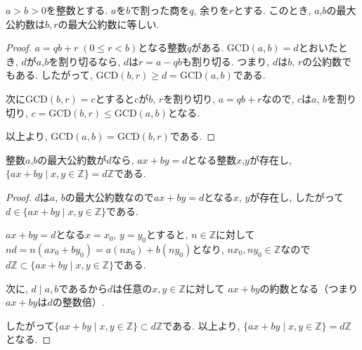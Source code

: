 \begin{tcolorbox}
	\begin{thm*}
	  $a>b>0$を整数とする. $a$を$b$で割った商を$q$, 余りを$r$とする.
		このとき, $a$,$b$の最大公約数は$b,r$の最大公約数に等しい.
	\end{thm*}
\end{tcolorbox}
\begin{proof}
  $a=qb+r \; (0 \leq r <b)$となる整数$q$がある.
  $\mathrm{GCD}(a,b)=d$とおいたとき, $d$が$a$,$b$を割り切るなら,
  $d$は$r=a-qb$も割り切る. つまり, $d$は$b$, $r$の公約数でもある.
  したがって, $\mathrm{GCD}(b,r) \geq d=\mathrm{GCD}(a,b)$である.

  次に$\mathrm{GCD}(b,r)=c$とすると$c$が$b$, $r$を割り切り,
  $a=qb+r$なので, $c$は$a$, $b$を割り切り,
  $c=\mathrm{GCD}(b,r) \leq \mathrm{GCD}(a,b)$となる.
  
  以上より, $\mathrm{GCD}(a,b)=\mathrm{GCD}(b,r)$である.
\end{proof}\leavevmode

\begin{tcolorbox}
	\begin{thm*}
	  整数$a$,$b$の最大公約数が$d$なら,
	  $ax+by=d$となる整数$x$,$y$が存在し,
	  $\{ax+by \mid x,y \in \mathbb{Z} \} =d\mathbb{Z}$である.
	\end{thm*}
\end{tcolorbox}
\begin{proof}
  $d$は$a$, $b$の最大公約数なので$ax+by=d$となる$x$, $y$が存在し,
  したがって$d \in \{ax+by \mid x,y \in \mathbb{Z} \}$である.

  $ax+by=d$となる$x = x_0$, $y = y_0$とすると,
  $n \in \mathbb{Z}$に対して$nd = n(ax_0 + by_0)=a(nx_0)+b(ny_0)$となり,
  $nx_0,ny_0 \in \mathbb{Z}$なので
  $ d\mathbb{Z} \subset \{ax+by \mid x,y \in \mathbb{Z} \} $である.

  次に, $d \mid a,b $であるから$d$は任意の$x, y \in \mathbb{Z}$に対して
  $ax+by$の約数となる（つまり$ax+by$は$d$の整数倍）.

  したがって$\{ax+by \mid x,y \in \mathbb{Z} \} \subset d\mathbb{Z}$である.
  以上より, $\{ax+by \mid x,y \in \mathbb{Z} \} = d\mathbb{Z}$ となる.
\end{proof}\leavevmode

